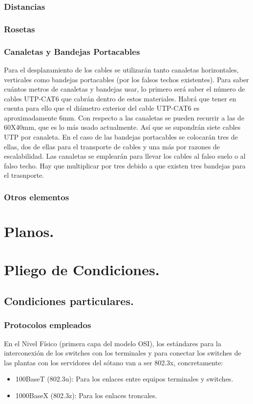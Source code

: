 \documentclass[a4paper,10pt]{article}
\begin{document}
\subsubsection{Distancias}
\subsubsection{Rosetas}
\subsubsection{Canaletas y Bandejas Portacables}
Para el desplazamiento de los cables se utilizarán tanto canaletas horizontales, verticales como bandejas portacables (por los falsos techos existentes). Para saber cuántos metros de canaletas y bandejas usar, lo primero será saber el número de cables UTP-CAT6 que cabrán dentro de estos materiales. Habrá que tener en cuenta para ello que el diámetro exterior del cable UTP-CAT6 es aproximadamente 6mm.
Con respecto a las canaletas se pueden recurrir a las de 60X40mm, que es lo más usado actualmente. Así que se supondrán siete cables UTP por canaleta.
En el caso de las bandejas portacables se colocarán tres de ellas, dos de ellas para el transporte de cables y una más por razones de escalabilidad.
Las canaletas se emplearán para llevar los cables al falso suelo o al falso techo.
Hay que multiplicar por tres debido a que existen tres bandejas para el trasnporte.
\subsubsection{Otros elementos}

\section{Planos.}
\section{Pliego de Condiciones.}
\subsection{Condiciones particulares.}
\subsubsection{Protocolos empleados}
En el Nivel Físico (primera capa del modelo OSI), los estándares para la interconexión de los switches con los terminales y para conectar los switches de las plantas con  los servidores del sótano van a ser
802.3x, concretamente:
\begin{itemize}
	\item 100BaseT (802.3u): Para los enlaces entre equipos terminales y switches.
	\item 1000BaseX (802.3z): Para los enlaces troncales.
\end{itemize}
 
\end{document}
